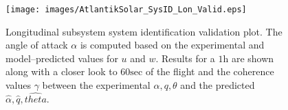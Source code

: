 %
\begin{figure}[htbp]
\centering
  \texttt{[image: images/AtlantikSolar\_SysID\_Lon\_Valid.eps]}
\caption{Longitudinal subsystem system identification validation plot. The angle of attack $\alpha$ is computed based on the experimental and model--predicted values for $u$ and $w$. Results for a $1\textrm{h}$ are shown along with a closer look to $60\textrm{sec}$ of the flight and the coherence values $\gamma$ between the experimental $\alpha,q,\theta$ and the predicted $\hat{\alpha},\hat{q},\hat{theta}$. }
\label{SysID_LonValid}
\end{figure}
% 